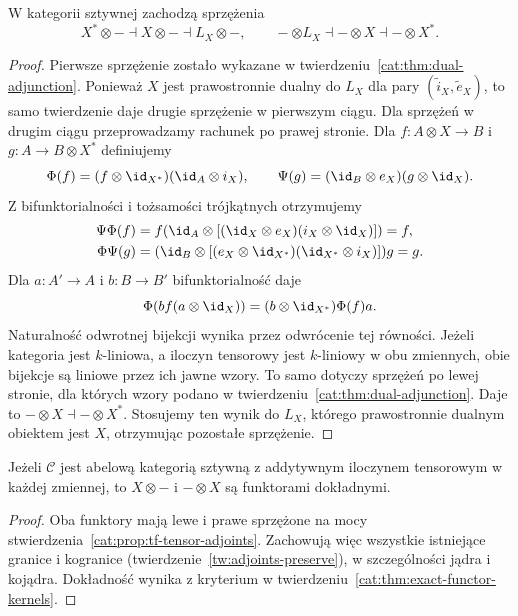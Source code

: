 \begin{stwierdzenie}\label{cat:prop:tf-tensor-adjoints}
W kategorii sztywnej zachodzą sprzężenia
\[
 X^*\otimes-\dashv X\otimes-\dashv L_X\otimes-,
 \qquad
 -\otimes L_X\dashv-\otimes X\dashv-\otimes X^*.
\]
\end{stwierdzenie}
\begin{proof}
Pierwsze sprzężenie zostało wykazane w twierdzeniu~\ref{cat:thm:dual-adjunction}. Ponieważ $X$ jest prawostronnie dualny do $L_X$ dla pary $(\widetilde i_X,\widetilde e_X)$, to samo twierdzenie daje drugie sprzężenie w pierwszym ciągu. Dla sprzężeń w drugim ciągu przeprowadzamy rachunek po prawej stronie. Dla $f:A\otimes X\to B$ i $g:A\to B\otimes X^*$ definiujemy
\[
 \Phi(f)=(f\otimes\id_{X^*})(\id_A\otimes i_X),\qquad
 \Psi(g)=(\id_B\otimes e_X)(g\otimes\id_X).
\]
Z bifunktorialności i tożsamości trójkątnych otrzymujemy
\[
\begin{aligned}
 \Psi\Phi(f)
 &= f(\id_A\otimes[(\id_X\otimes e_X)(i_X\otimes\id_X)])=f,\\
 \Phi\Psi(g)
 &= (\id_B\otimes[(e_X\otimes\id_{X^*})(\id_{X^*}\otimes i_X)])g=g.
\end{aligned}
\]
Dla $a:A'\to A$ i $b:B\to B'$ bifunktorialność daje
\[
 \Phi(bf(a\otimes\id_X))=(b\otimes\id_{X^*})\Phi(f)a.
\]
Naturalność odwrotnej bijekcji wynika przez odwrócenie tej równości. Jeżeli kategoria jest $k$-liniowa, a iloczyn tensorowy jest $k$-liniowy w obu zmiennych, obie bijekcje są liniowe przez ich jawne wzory. To samo dotyczy sprzężeń po lewej stronie, dla których wzory podano w twierdzeniu~\ref{cat:thm:dual-adjunction}. Daje to $-\otimes X\dashv-\otimes X^*$. Stosujemy ten wynik do $L_X$, którego prawostronnie dualnym obiektem jest $X$, otrzymując pozostałe sprzężenie.
\end{proof}

\begin{wniosek}\label{cat:cor:tf-tensor-exact}
Jeżeli $\mathcal C$ jest abelową kategorią sztywną z addytywnym iloczynem tensorowym w każdej zmiennej, to $X\otimes-$ i $-\otimes X$ są funktorami dokładnymi.
\end{wniosek}
\begin{proof}
Oba funktory mają lewe i prawe sprzężone na mocy stwierdzenia~\ref{cat:prop:tf-tensor-adjoints}. Zachowują więc wszystkie istniejące granice i kogranice (twierdzenie~\ref{tw:adjoints-preserve}), w szczególności jądra i kojądra. Dokładność wynika z kryterium w twierdzeniu~\ref{cat:thm:exact-functor-kernels}.
\end{proof}

